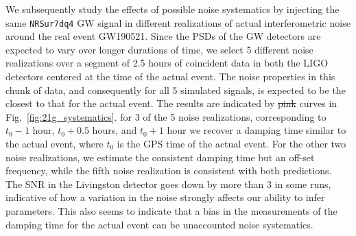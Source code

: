 We subsequently study the effects of possible noise systematics by
injecting the same \texttt{NRSur7dq4} GW signal in different
realizations of actual interferometric noise around the real event
GW190521. Since the PSDs of the GW detectors are expected to vary over
longer durations of time, we select 5 different noise realizations
over a segment of 2.5 hours of coincident data in both the LIGO
detectors centered at the time of the actual event. The noise
properties in this chunk of data, and consequently for all 5 simulated
signals, is expected to be the closest to that for the actual
event. The results are indicated by \sout{pink}  curves in
Fig.~\ref{fig:21g_systematics}. 
for 3 of the 5 noise realizations,
corresponding to $t_0-1$ hour, $t_0+0.5$ hours, and $t_0+1$ hour we
recover a damping time similar to the actual event, where $t_0$ is the
GPS time of the actual event. For the other two noise realizations, we
estimate the consistent damping time but an off-set frequency, while
the fifth noise realization is consistent with both predictions. The
SNR in the Livingston detector goes down by more than  3 in some
runs, indicative of how a variation in the noise strongly affects our
ability to infer parameters. This also seems to indicate that a bias
in the measurements of the damping time for the actual event  can be unaccounted noise systematics.

